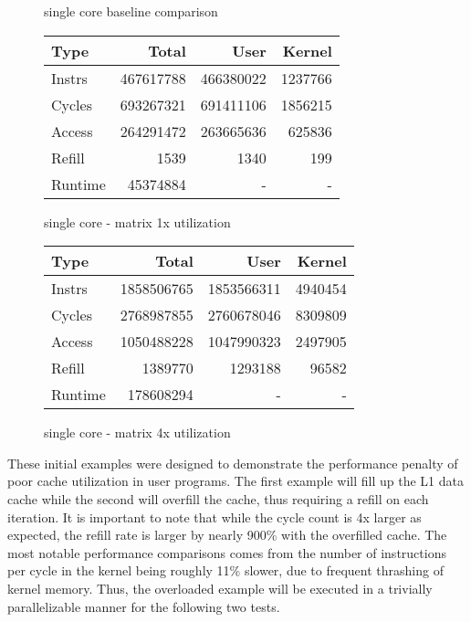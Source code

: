 \documentclass[11pt]{article}
\begin{document}
\begin{figure*}[h]
	\caption{single core baseline comparison}
	\centering
	\begin{subtable}{.48\linewidth}
		\centering
		\begin{tabular}{ l|rrr }
			Type    & Total     & User      & Kernel  \\
			\hline
			Instrs  & 467617788 & 466380022 & 1237766 \\ 
			Cycles  & 693267321 & 691411106 & 1856215 \\ 
			Access  & 264291472 & 263665636 & 625836  \\ 
			Refill  & 1539      & 1340      & 199     \\ 
			Runtime & 45374884  & -         & -       \\ 
			\hline
		\end{tabular}
		\caption{single core - matrix 1x utilization}
	\end{subtable}
	\hfill
	\begin{subtable}{.48\linewidth}
		\centering
		\begin{tabular}{ l|rrr }
			Type    & Total      & User       & Kernel  \\
			\hline
			Instrs  & 1858506765 & 1853566311 & 4940454 \\ 
			Cycles  & 2768987855 & 2760678046 & 8309809 \\ 
			Access  & 1050488228 & 1047990323 & 2497905 \\ 
			Refill  & 1389770    & 1293188    & 96582   \\ 
			Runtime & 178608294  & -          & -       \\ 
			\hline
		\end{tabular}
		\caption{single core - matrix 4x utilization}
	\end{subtable}
\end{figure*}

These initial examples were designed to demonstrate the performance penalty of poor cache utilization in user programs.  The first example will fill up the L1 data cache while the second will overfill the cache, thus requiring a refill on each iteration.  It is important to note that while the cycle count is 4x larger as expected, the refill rate is larger by nearly 900\% with the overfilled cache.  The most notable performance comparisons comes from the number of instructions per cycle in the kernel being roughly 11\% slower, due to frequent thrashing of kernel memory.  Thus, the overloaded example will be executed in a trivially parallelizable manner for the following two tests.
\end{document}
